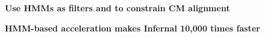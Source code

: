\documentclass[landscape]{slides}
\begin{document}
\begin{slide}
\begin{center}
\large
\textbf{Use HMMs as filters and to constrain CM alignment}
\end{center}


\vfill
\end{slide}
\begin{slide}
\begin{center}

\textbf{HMM-based acceleration makes Infernal 10,000 times faster}

\end{center}
\medskip


\vfill 
\end{slide}
\end{document}
